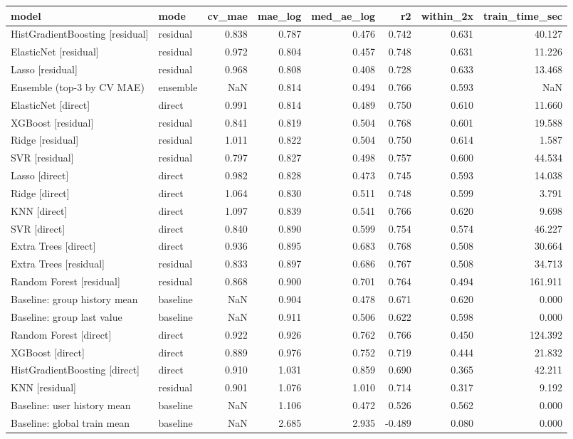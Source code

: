 \begin{tabular}{llrrrrrr}
\toprule
model & mode & cv_mae & mae_log & med_ae_log & r2 & within_2x & train_time_sec \\
\midrule
HistGradientBoosting [residual] & residual & 0.838 & 0.787 & 0.476 & 0.742 & 0.631 & 40.127 \\
ElasticNet [residual] & residual & 0.972 & 0.804 & 0.457 & 0.748 & 0.631 & 11.226 \\
Lasso [residual] & residual & 0.968 & 0.808 & 0.408 & 0.728 & 0.633 & 13.468 \\
Ensemble (top-3 by CV MAE) & ensemble & NaN & 0.814 & 0.494 & 0.766 & 0.593 & NaN \\
ElasticNet [direct] & direct & 0.991 & 0.814 & 0.489 & 0.750 & 0.610 & 11.660 \\
XGBoost [residual] & residual & 0.841 & 0.819 & 0.504 & 0.768 & 0.601 & 19.588 \\
Ridge [residual] & residual & 1.011 & 0.822 & 0.504 & 0.750 & 0.614 & 1.587 \\
SVR [residual] & residual & 0.797 & 0.827 & 0.498 & 0.757 & 0.600 & 44.534 \\
Lasso [direct] & direct & 0.982 & 0.828 & 0.473 & 0.745 & 0.593 & 14.038 \\
Ridge [direct] & direct & 1.064 & 0.830 & 0.511 & 0.748 & 0.599 & 3.791 \\
KNN [direct] & direct & 1.097 & 0.839 & 0.541 & 0.766 & 0.620 & 9.698 \\
SVR [direct] & direct & 0.840 & 0.890 & 0.599 & 0.754 & 0.574 & 46.227 \\
Extra Trees [direct] & direct & 0.936 & 0.895 & 0.683 & 0.768 & 0.508 & 30.664 \\
Extra Trees [residual] & residual & 0.833 & 0.897 & 0.686 & 0.767 & 0.508 & 34.713 \\
Random Forest [residual] & residual & 0.868 & 0.900 & 0.701 & 0.764 & 0.494 & 161.911 \\
Baseline: group history mean & baseline & NaN & 0.904 & 0.478 & 0.671 & 0.620 & 0.000 \\
Baseline: group last value & baseline & NaN & 0.911 & 0.506 & 0.622 & 0.598 & 0.000 \\
Random Forest [direct] & direct & 0.922 & 0.926 & 0.762 & 0.766 & 0.450 & 124.392 \\
XGBoost [direct] & direct & 0.889 & 0.976 & 0.752 & 0.719 & 0.444 & 21.832 \\
HistGradientBoosting [direct] & direct & 0.910 & 1.031 & 0.859 & 0.690 & 0.365 & 42.211 \\
KNN [residual] & residual & 0.901 & 1.076 & 1.010 & 0.714 & 0.317 & 9.192 \\
Baseline: user history mean & baseline & NaN & 1.106 & 0.472 & 0.526 & 0.562 & 0.000 \\
Baseline: global train mean & baseline & NaN & 2.685 & 2.935 & -0.489 & 0.080 & 0.000 \\
\bottomrule
\end{tabular}
